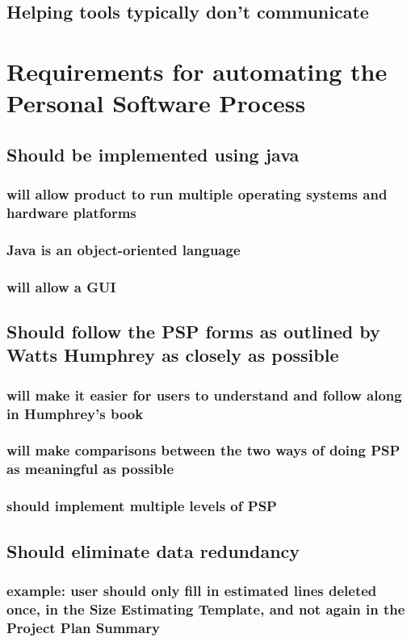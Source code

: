 \section{Helping tools typically don't communicate}
\chapter{Requirements for automating the Personal Software Process}
\section{Should be implemented using java}
\subsection{will allow product to run multiple operating systems and
hardware platforms}
\subsection{Java is an object-oriented language}
\subsection{will allow a GUI}
\section{Should follow the PSP forms as outlined by Watts Humphrey as
closely as possible}
\subsection{will make it easier for users to understand and follow along in
Humphrey's book}
\subsection{will make comparisons between the two ways of doing PSP as
meaningful as possible}
\subsection{should implement multiple levels of PSP}
\section{Should eliminate data redundancy}
\subsection{example: user should only fill in estimated lines deleted once,
in the Size Estimating Template, and not again in the Project Plan Summary}

